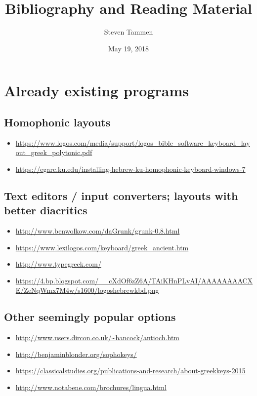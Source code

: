 \documentclass[11pt]{article}
\author{Steven Tammen}
\date{May 19, 2018}
\title{Bibliography and Reading Material}
\begin{document}
\maketitle
\setcounter{tocdepth}{2}
\tableofcontents


\section{Already existing programs}
\label{sec:org18e7aaf}

\subsection{Homophonic layouts}
\label{sec:org78942c0}
\begin{itemize}
\item \url{https://www.logos.com/media/support/logos\_bible\_software\_keyboard\_layout\_greek\_polytonic.pdf}
\item \url{https://egarc.ku.edu/installing-hebrew-ku-homophonic-keyboard-windows-7}
\end{itemize}

\subsection{Text editors / input converters; layouts with better diacritics}
\label{sec:org094f0a6}

\begin{itemize}
\item \url{http://www.benwolkow.com/daGrunk/grunk-0.8.html}
\item \url{https://www.lexilogos.com/keyboard/greek\_ancient.htm}
\item \url{http://www.typegreek.com/}
\item \url{https://4.bp.blogspot.com/\_\_cXdOf6zZ6A/TAiKHnPLvAI/AAAAAAAACXE/ZeNqWmx7M4w/s1600/logoshebrewkbd.png}
\end{itemize}

\subsection{Other seemingly popular options}
\label{sec:org5f1fa88}

\begin{itemize}
\item \url{http://www.users.dircon.co.uk/\~hancock/antioch.htm}
\item \url{http://benjaminblonder.org/sophokeys/}
\item \url{https://classicalstudies.org/publications-and-research/about-greekkeys-2015}
\item \url{http://www.notabene.com/brochures/lingua.html}
\end{itemize}
\end{document}

